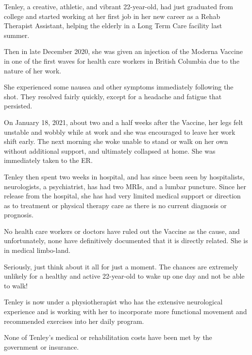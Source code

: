 Tenley, a creative, athletic, and vibrant 22-year-old, had just graduated from
college and started working at her first job in her new career as a Rehab
Therapist Assistant, helping the elderly in a Long Term Care facility last
summer.

Then in late December 2020, she was given an injection of the Moderna Vaccine in
one of the first waves for health care workers in British Columbia due to the
nature of her work.

She experienced some nausea and other symptoms immediately following the
shot. They resolved fairly quickly, except for a headache and fatigue that
persisted.

On January 18, 2021, about two and a half weeks after the Vaccine, her legs felt
unstable and wobbly while at work and she was encouraged to leave her work shift
early. The next morning she woke unable to stand or walk on her own without
additional support, and ultimately collapsed at home. She was immediately taken
to the ER.

Tenley then spent two weeks in hospital, and has since been seen by
hospitalists, neurologists, a psychiatrist, has had two MRIs, and a lumbar
puncture. Since her release from the hospital, she has had very limited medical
support or direction as to treatment or physical therapy care as there is no
current diagnosis or prognosis.

No health care workers or doctors have ruled out the Vaccine as the cause, and
unfortunately, none have definitively documented that it is directly
related. She is in medical limbo-land.

Seriously, just think about it all for just a moment. The chances are extremely
unlikely for a healthy and active 22-year-old to wake up one day and not be able
to walk!

Tenley is now under a physiotherapist who has the extensive neurological
experience and is working with her to incorporate more functional movement and
recommended exercises into her daily program.

None of Tenley’s medical or rehabilitation costs have been met by the government
or insurance.


